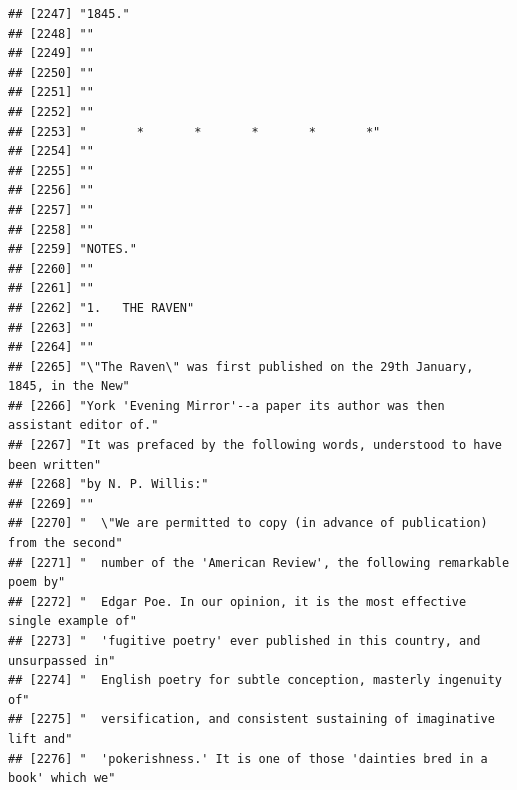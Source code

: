\documentclass{article}\usepackage[]{graphicx}\usepackage[]{color}
\makeatletter
\newenvironment{kframe}{%
 \def\at@end@of@kframe{}%
 \ifinner\ifhmode%
  \def\at@end@of@kframe{\end{minipage}}%
  \begin{minipage}{\columnwidth}%
 \fi\fi%
 \def\FrameCommand##1{\hskip\@totalleftmargin \hskip-\fboxsep
 \colorbox{shadecolor}{##1}\hskip-\fboxsep
     \hskip-\linewidth \hskip-\@totalleftmargin \hskip\columnwidth}%
 \MakeFramed {\advance\hsize-\width
   \@totalleftmargin\z@ \linewidth\hsize
   \@setminipage}}%
 {\par\unskip\endMakeFramed%
 \at@end@of@kframe}
\newenvironment{knitrout}{}{} %
\makeatother
\begin{document}
\begin{knitrout}
\begin{kframe}
\begin{verbatim}
## [2247] "1845."                                                                       
## [2248] ""                                                                            
## [2249] ""                                                                            
## [2250] ""                                                                            
## [2251] ""                                                                            
## [2252] ""                                                                            
## [2253] "       *       *       *       *       *"                                    
## [2254] ""                                                                            
## [2255] ""                                                                            
## [2256] ""                                                                            
## [2257] ""                                                                            
## [2258] ""                                                                            
## [2259] "NOTES."                                                                      
## [2260] ""                                                                            
## [2261] ""                                                                            
## [2262] "1.   THE RAVEN"                                                              
## [2263] ""                                                                            
## [2264] ""                                                                            
## [2265] "\"The Raven\" was first published on the 29th January, 1845, in the New"     
## [2266] "York 'Evening Mirror'--a paper its author was then assistant editor of."     
## [2267] "It was prefaced by the following words, understood to have been written"     
## [2268] "by N. P. Willis:"                                                            
## [2269] ""                                                                            
## [2270] "  \"We are permitted to copy (in advance of publication) from the second"    
## [2271] "  number of the 'American Review', the following remarkable poem by"         
## [2272] "  Edgar Poe. In our opinion, it is the most effective single example of"     
## [2273] "  'fugitive poetry' ever published in this country, and unsurpassed in"      
## [2274] "  English poetry for subtle conception, masterly ingenuity of"               
## [2275] "  versification, and consistent sustaining of imaginative lift and"          
## [2276] "  'pokerishness.' It is one of those 'dainties bred in a book' which we"     

\end{verbatim}
\end{kframe}
\end{knitrout}
\end{document}
